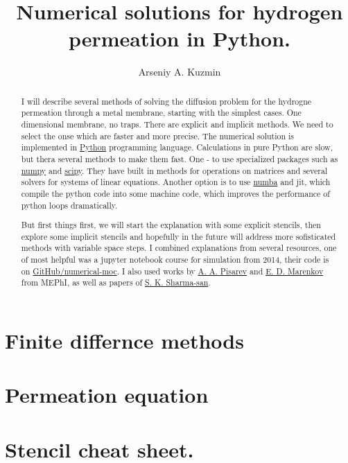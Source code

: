 \documentclass[12pt]{article}
\title{Numerical solutions for hydrogen permeation in Python.}
\author{Arseniy A. Kuzmin}
\begin{document}
\maketitle

\begin{abstract}
I will describe several methods of solving the diffusion problem for the hydrogne permeation through a metal membrane, starting with the simplest cases. One dimensional membrane, no traps. There are explicit and implicit methods. We need to select the onse which are faster and more precise. The numerical solution is implemented in \href{https://www.python.org/}{Python} programming language. Calculations in pure Python are slow, but thera several methods to make them fast. One - to use specialized packages such as \href{https://numpy.org/}{numpy} and \href{https://www.scipy.org/}{scipy}. They have built in methods for operations on matrices and several solvers for systems of linear equations. Another option is to use \href{https://numba.pydata.org/}{numba} and jit, which compile the python code into some machine code, which improves the performance of python loops dramatically.

But first things first, we will start the explanation with some explicit stencils, then explore some implicit stencils and hopefully in the future will address more sofisticated methods with variable space steps. I combined explanations from several resources, one of most helpful was a jupyter notebook course for simulation from 2014, their code is on \href{https://github.com/numerical-mooc/numerical-mooc}{GitHub/numerical-moc}. I also used works by \href{https://www.researchgate.net/profile/A_Pisarev}{A. A. Pisarev} and \href{https://www.researchgate.net/profile/E_Marenkov}{E. D. Marenkov} from MEPhI, as well as papers of \href{https://www.researchgate.net/profile/SK_Sharma2}{S. K. Sharma-san}.
\end{abstract}

\section{Finite differnce methods}
%
%


\section{Permeation equation}
%
%



\section{Stencil cheat sheet.}
%
%

\end{document}
